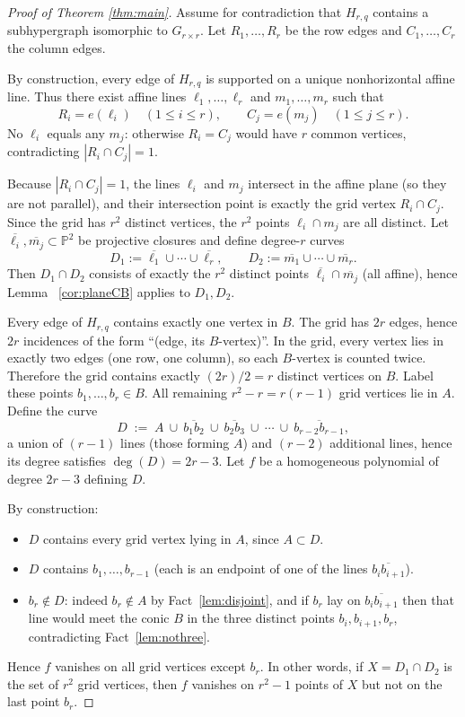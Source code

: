 \documentclass[11pt]{article}
\theoremstyle{definition}
\theoremstyle{remark}
\newcommand{\PP}{\mathbb{P}}
\begin{document}
\begin{proof}[Proof of Theorem \ref{thm:main}]
Assume for contradiction that $H_{r,q}$ contains a subhypergraph isomorphic to $G_{r\times r}$.
Let $R_1,\dots,R_r$ be the row edges and $C_1,\dots,C_r$ the column edges.

By construction, every edge of $H_{r,q}$ is supported on a unique nonhorizontal affine line.
Thus there exist affine lines $\ell_1,\dots,\ell_r$ and $m_1,\dots,m_r$ such that
\[
R_i=e(\ell_i)\quad(1\le i\le r),
\qquad
C_j=e(m_j)\quad(1\le j\le r).
\]
No $\ell_i$ equals any $m_j$: otherwise $R_i=C_j$ would have $r$ common vertices, contradicting $|R_i\cap C_j|=1$.

Because $|R_i\cap C_j|=1$, the lines $\ell_i$ and $m_j$ intersect in the affine plane (so they are not parallel),
and their intersection point is exactly the grid vertex $R_i\cap C_j$.
Since the grid has $r^2$ distinct vertices, the $r^2$ points $\ell_i\cap m_j$ are all distinct. Let $\overline{\ell_i},\overline{m_j}\subset \PP^2$ be projective closures and define degree-$r$ curves
\[
D_1 := \overline{\ell_1}\cup\cdots\cup \overline{\ell_r},
\qquad
D_2 := \overline{m_1}\cup\cdots\cup \overline{m_r}.
\]
Then $D_1\cap D_2$ consists of exactly the $r^2$ distinct points $\overline{\ell_i}\cap \overline{m_j}$
(all affine), hence Lemma ~\ref{cor:planeCB} applies to $D_1,D_2$.

Every edge of $H_{r,q}$ contains exactly one vertex in $B$.
The grid has $2r$ edges, hence $2r$ incidences of the form ``(edge, its $B$-vertex)''.
In the grid, every vertex lies in exactly two edges (one row, one column), so each $B$-vertex is counted twice.
Therefore the grid contains exactly $(2r)/2=r$ distinct vertices on $B$.
Label these points $b_1,\dots,b_r\in B$.
All remaining $r^2-r=r(r-1)$ grid vertices lie in $A$. Define the curve
\[
D \;:=\; A\ \cup\ \overline{b_1b_2}\ \cup\ \overline{b_2b_3}\ \cup\ \cdots\ \cup\ \overline{b_{r-2}b_{r-1}},
\]
a union of $(r-1)$ lines (those forming $A$) and $(r-2)$ additional lines, hence its degree satisfies $\deg(D)=2r-3$.
Let $f$ be a homogeneous polynomial of degree $2r-3$ defining $D$.

By construction:
\begin{itemize}[leftmargin=2em]
\item $D$ contains every grid vertex lying in $A$, since $A\subset D$.
\item $D$ contains $b_1,\dots,b_{r-1}$ (each is an endpoint of one of the lines $\overline{b_ib_{i+1}}$).
\item $b_r\notin D$: indeed $b_r\notin A$ by Fact~\ref{lem:disjoint}, and if $b_r$ lay on
$\overline{b_ib_{i+1}}$ then that line would meet the conic $B$ in the three distinct points
$b_i,b_{i+1},b_r$, contradicting Fact~\ref{lem:nothree}.
\end{itemize}
Hence $f$ vanishes on all grid vertices except $b_r$. In other words, if $X=D_1\cap D_2$ is the set of $r^2$ grid vertices, then $f$ vanishes on $r^2-1$ points of $X$
but not on the last point $b_r$.


\end{proof}
\end{document}
